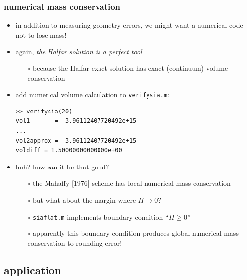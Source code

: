 \begin{frame}[fragile]
\frametitle{numerical mass conservation}

\begin{itemize}
\item in addition to measuring geometry errors, we might want a numerical code not to lose mass!
\item again, \emph{the Halfar solution is a perfect tool}
  \begin{itemize}
  \item[$\circ$] because the Halfar exact solution has exact (continuum) volume conservation
  \end{itemize}
\item add numerical volume calculation to \texttt{verifysia.m}:
\small
\begin{verbatim}
>> verifysia(20)
vol1       =  3.96112407720492e+15
...
vol2approx =  3.96112407720492e+15
voldiff = 1.50000000000000e+00
\end{verbatim}
\normalsize
\item huh?  how can it be that good?
  \begin{itemize}
  \item[$\circ$] the Mahaffy [1976] scheme has local numerical mass conservation
  \item[$\circ$] but what about the margin where $H\to 0$?
  \item[$\circ$] \texttt{siaflat.m} implements boundary condition \quad ``$H\ge 0$''
  \item[$\circ$] apparently this boundary condition produces global numerical mass conservation to rounding error!
  \end{itemize}
\end{itemize}
\end{frame}


\subsection{application}

